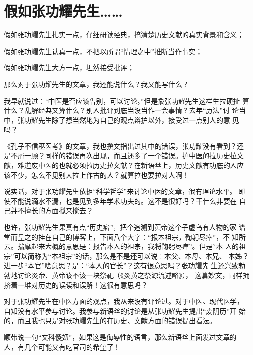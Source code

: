 \chapter{假如张功耀先生……}

假如张功耀先生扎实一点，仔细研读经典，搞清楚历史文献的真实背景和含义；

假如张功耀先生认真一点，不把以所谓“情理之中”推断当作事实；

假如张功耀先生大方一点，坦然接受批评；

那么对于张功耀先生的文章，我还能说什么？我又能写什么？

\mbox{}

我早就说过：“中医是否应该告别，可以讨论。”但是象张功耀先生这样生拉硬扯
算什么？乱解经典又算什么？别人批评到底当没当作一会事情？去年“历法”讨
论当中，张功耀先生除了想当然地为自己的观点辩护以外，接受过一点别人的意
见吗？

《孔子不信巫医考》的文章，我也撰文指出过其中的错误，张功耀没有看到？还
是不屑一顾？同样的错误再次出现，而且还多了一个错误。护中医的拉历史拉文
献，难道废中医的也就必须拉历史拉文献？在新语丝上，历史文献有功底的人应
该不少，怎么不见别人拉上作古的人？就算拉也要拉对人啊！

说实话，对于张功耀先生依据“科学哲学”来讨论中医的文章，很有理论水平。
即使不能说滴水不漏，也是见到多年学术功夫的。这不是很好吗？干什么非要在
自己并不擅长的方面搅来搅去？

也许，张功耀先生果真有点“历史癖”，把个追溯到黄帝这个子虚乌有人物的家
谱堂而皇之的挂在自己的博客上，下面八个大字：“报本祖宗，鞠躬尽瘁”，不
知所云。揣摩起来大概的意思是：报告本人的祖宗，我将鞠躬尽瘁”。但是“本
人的祖宗”可以简称为“本祖宗”的话，那么是不是还可以说：本父、本母、本兄、
本姊？进一步“本官”啥意思？是：“本人的官长”？这有很意思吗？张功耀先
生还兴致勃勃地讨论炎帝、黄帝该不该一块祭祀（《炎黄之祭源流述略》），
这篇妙文，同样拥挤着一堆对历史的误读和误解！这很有意思吗？

对于张功耀先生在中医方面的观点，我从来没有评论过。对于中医、现代医学，
自知没有水平参与讨论。我参与新语丝的讨论是从张功耀先生提出“废阴历”开
始的，而且我也只是对张功耀先生的在历史、文献方面的错误提出看法。

顺带说一句“文科傻妞”，如果这是侮辱性的语言，那么新语丝上面发过文章的
人，有几个可能又有吃官司的希望了！
